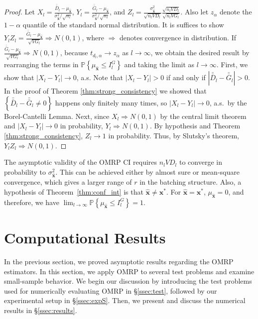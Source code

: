 \documentclass[12pt]{article}
\newcommand{\p}[1]{\mathbb{P} \left\{ #1 \right\}}
\newcommand{\x}{\mathbf{x}}
\newcommand{\xh}{{\hat{\x}}}
\newcommand{\xs}{\x^*}
\newcommand{\gb}{\bar{G}}
\newcommand{\gbb}{\bar{\gb}}
\newcommand{\db}{\bar{D}}
\newcommand{\dbb}{\bar{\db}}
\begin{document}
\begin{proof} 
			Let $X_l = \frac{\dbb_l - \mu_\xh}{\sigma^2_\xh/\sqrt{n_l}}$, $Y_l = \frac{\gbb_l - \mu_\xh}{\sigma^2_\xh/\sqrt{n_l}}$, and $Z_l = \frac{\sigma^2_\xh}{\sqrt{n_lVD_l}} \frac{\sqrt{n_lVD_l}}{\sqrt{n_lVG_l}}$. 
			Also let $z_{\alpha}$ denote the $1-\alpha$ quantile of the standard normal distribution. 
        It is suffices to show $Y_lZ_l = \frac{\gbb_l - \mu_\xh}{\sqrt{VG_l}} \Rightarrow N(0,1)$, where $\Rightarrow$ denotes convergence in distribution.
			If $\frac{\gbb_l - \mu_\xh}{\sqrt{VG_l}} \Rightarrow N(0,1)$, because $t_{d_l,\alpha} \rightarrow z_{\alpha}$ as $l \rightarrow \infty$, we obtain the desired result by rearranging the terms in $\p{\mu_\xh \leq I^G_l}$ and taking the limit as $l \rightarrow \infty$.
        First, we show that $|X_l - Y_l| \rightarrow 0$, a.s.  Note that $|X_l - Y_l| > 0$ if and only if $|\dbb_l - \gbb_l| > 0$.  
        In the proof of Theorem \ref{thm:strong_consistency} we showed that $\left\{ \dbb_l - \gbb_l \neq 0 \right\}$ happens only finitely many times, so $|X_l - Y_l| \rightarrow 0$, a.s.\ by the Borel-Cantelli Lemma. 
        Next, since $X_l \Rightarrow N(0,1)$  by the central limit theorem and $|X_l - Y_l| \rightarrow 0$ in probability, $Y_l \Rightarrow N(0,1)$.  
        By hypothesis and Theorem \ref{thm:strong_consistency}, $Z_l \rightarrow 1$ in probability.  
        Thus, by Slutsky's theorem, $Y_lZ_l \Rightarrow N(0,1)$.
\end{proof}

The asymptotic validity of the OMRP CI requires $n_l VD_l$ to converge in probability to $\sigma^{2}_{\xh}$. 
This can be achieved either by almost sure or mean-square convergence, which gives a larger range of $r$ in the batching structure.
Also, a hypothesis of Theorem~\ref{thm:conf_int} is that $\xh \neq \xs$.  
For $\xh = \xs$, $\mu_\xh = 0$, and therefore, we have $\lim_{l\rightarrow\infty} \p{\mu_\xh \leq I^G_l} = 1$. 

\section{Computational Results}
\label{sec:comp}

In the previous section, we proved asymptotic results regarding the OMRP estimators. 
In this section, we apply OMRP to several test problems and examine small-sample behavior. 
We begin our discussion by introducing the test problems used for numerically evaluating OMRP in \S \ref{ssec:test}, followed by our experimental setup in \S \ref{ssec:expS}. Then, we present and discuss the numerical results in \S \ref{ssec:results}. 
\end{document}
